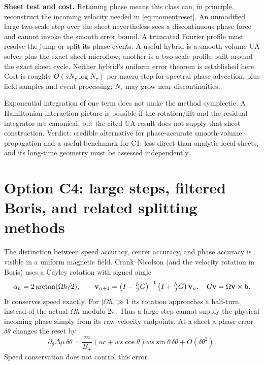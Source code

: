 \documentclass[10pt,a4paper]{article}
\begin{document}
\textbf{Sheet test and cost.} Retaining phase means this class can, in principle, reconstruct the incoming velocity needed in \eqref{eq:momentreset}. An unmodified large two-scale step over the sheet nevertheless sees a discontinuous phase force and cannot invoke the smooth error bound. A truncated Fourier profile must resolve the jump or split its phase events. A useful hybrid is a smooth-volume UA solver plus the exact sheet microflow; another is a two-scale profile built around the exact sheet cycle. Neither hybrid's uniform error theorem is established here. Cost is roughly $O(s N_\tau\log N_\tau)$ per macro step for spectral phase advection, plus field samples and event processing; $N_\tau$ may grow near discontinuities.

Exponential integration of one term does not make the method symplectic. A Hamiltonian interaction picture is possible if the rotation/lift and the residual integrator are canonical, but the cited UA result does not supply that sheet construction. Verdict: credible alternative for phase-accurate smooth-volume propagation and a useful benchmark for C1; less direct than analytic local sheets, and its long-time geometry must be assessed independently.

\section{Option C4: large steps, filtered Boris, and related splitting methods}
\label{sec:large}
The distinction between speed accuracy, center accuracy, and phase accuracy is visible in a uniform magnetic field. Crank--Nicolson (and the velocity rotation in Boris) uses a Cayley rotation with signed angle
\begin{equation}\label{eq:cayley}
 \alpha_h=2\arctan(\Omega h/2),\qquad
 \mathbf v_{n+1}=\left(I-\tfrac h2G\right)^{-1}
             \left(I+\tfrac h2G\right)\mathbf v_n,
 \quad G\mathbf v=\Omega\mathbf v\times\mathbf b.
\end{equation}
It conserves speed exactly. For $|\Omega h|\gg1$ its rotation approaches a half-turn, instead of the actual $\Omega h$ modulo $2\pi$. Thus a large step cannot supply the physical incoming phase simply from its raw velocity endpoints. At a sheet a phase error $\delta\theta$ changes the reset by
\begin{equation}\label{eq:musensitivity}
 \partial_\theta\Delta\mu\,\delta\theta
 =\frac m{B_+}(uc+ws\cos\theta)ws\sin\theta\,\delta\theta
       +O(\delta\theta^2).
\end{equation}
Speed conservation does not control this error.
\end{document}
